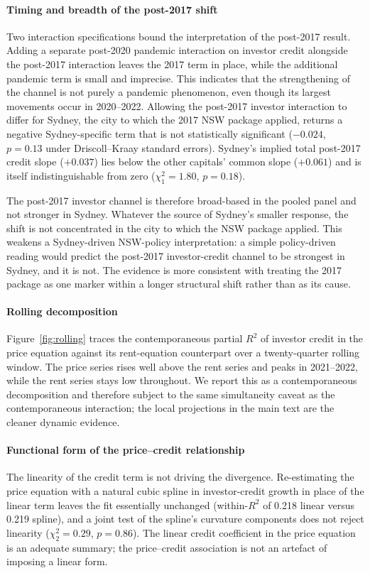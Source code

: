 \documentclass[preprint,11pt,authoryear]{elsarticle}
\begin{document}
\begin{appendices}
\paragraph{Timing and breadth of the post-2017 shift}

Two interaction specifications bound the interpretation of the
post-2017 result. Adding a separate post-2020 pandemic interaction on
investor credit alongside the post-2017 interaction leaves the 2017
term in place, while the additional pandemic term is small and
imprecise. This indicates that the strengthening of the channel is not
purely a pandemic phenomenon, even though its largest movements occur in
2020--2022. Allowing the post-2017 investor interaction to differ for
Sydney, the city to which the 2017 NSW package applied, returns a
negative Sydney-specific term that is not statistically significant
($-0.024$, $p = 0.13$ under Driscoll--Kraay standard errors). Sydney's
implied total post-2017 credit slope ($+0.037$) lies below the other
capitals' common slope ($+0.061$) and is itself indistinguishable from
zero ($\chi^2_1 = 1.80$, $p = 0.18$).

The post-2017 investor channel is therefore broad-based in the pooled
panel and not stronger in Sydney. Whatever the source of Sydney's
smaller response, the shift is not concentrated in the city to which the
NSW package applied. This weakens a Sydney-driven NSW-policy
interpretation: a simple policy-driven reading would predict the
post-2017 investor-credit channel to be strongest in Sydney, and it is
not. The evidence is more consistent with treating the 2017 package as
one marker within a longer structural shift rather than as its cause.



\paragraph{Rolling decomposition}
Figure~\ref{fig:rolling} traces the contemporaneous partial $R^2$ of
investor credit in the price equation against its rent-equation
counterpart over a twenty-quarter rolling window. The price series
rises well above the rent series and peaks in 2021--2022, while the
rent series stays low throughout. We report this as a contemporaneous
decomposition and therefore subject to the same simultaneity caveat as
the contemporaneous interaction; the local projections in the main text
are the cleaner dynamic evidence.

\paragraph{Functional form of the price--credit relationship}
The linearity of the credit term is not driving the divergence. Re-estimating
the price equation with a natural cubic spline in investor-credit growth in
place of the linear term leaves the fit essentially unchanged (within-$R^2$
of 0.218 linear versus 0.219 spline), and a joint test of the spline's
curvature components does not reject linearity ($\chi^2_2 = 0.29$,
$p = 0.86$). The linear credit coefficient in the price equation is an
adequate summary; the price--credit association is not an artefact of imposing
a linear form.


\end{appendices}
\end{document}

